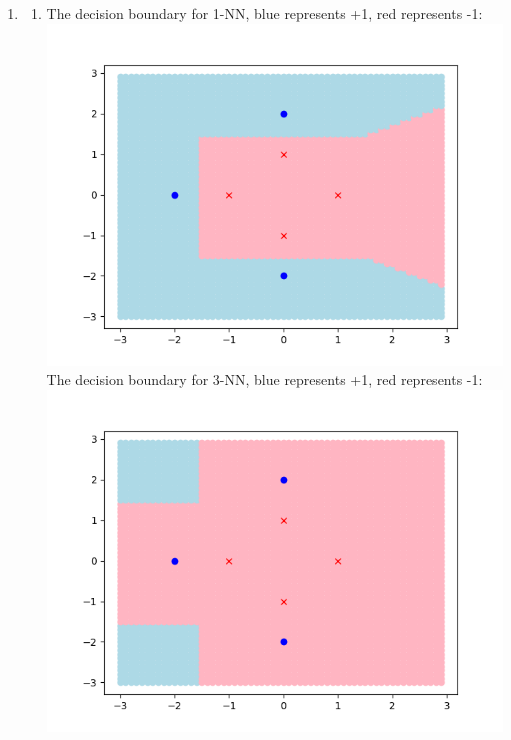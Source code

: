 \documentclass{article}
\begin{document}
\begin{enumerate}
        \item \begin{enumerate}[label=(\alph*)]
            \item The decision boundary for 1-NN, blue represents +1, red represents -1: \\ \includegraphics[scale=0.5]{images/p6_1_a.png}\\[0.25in]
            The decision boundary for 3-NN, blue represents +1, red represents -1: \\ \includegraphics[scale=0.5]{images/p6_1_a_3.png}

\end{enumerate}
\end{enumerate}
\end{document}
